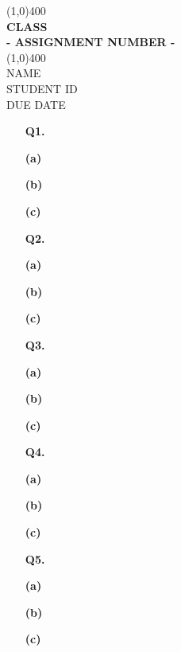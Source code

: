 \documentclass[11pt]{article}
\begin{document}
\begin{titlepage}
\begin{center}
\vspace*{1cm}
\vfill
\line(1,0){400}\\[1mm]
\huge{\textbf{CLASS}}\\[3mm]
\Large{\textbf{- ASSIGNMENT NUMBER - }} \\[1mm]
\line(1,0){400}\\
\vfill
NAME\\
STUDENT ID\\
DUE DATE\\
\end{center}
\end{titlepage}

\begin{enumerate}
\item[\textbf{Q1.}]
	\item[\textbf{(a)}]

	\item[\textbf{(b)}]

	\item[\textbf{(c)}]

\item[\textbf{Q2.}]
	\item[\textbf{(a)}]

	\item[\textbf{(b)}]

	\item[\textbf{(c)}]


\item[\textbf{Q3.}]
	\item[\textbf{(a)}]

	\item[\textbf{(b)}]

	\item[\textbf{(c)}]

\item[\textbf{Q4.}]
	\item[\textbf{(a)}]

	\item[\textbf{(b)}]

	\item[\textbf{(c)}]


\item[\textbf{Q5.}]
	\item[\textbf{(a)}]

	\item[\textbf{(b)}]

	\item[\textbf{(c)}]




\end{enumerate}
\end{document}
